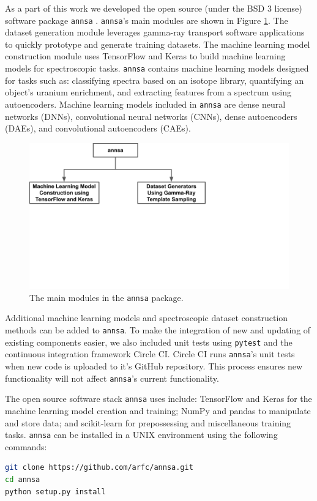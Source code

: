 As a part of this work we developed the open source (under the BSD 3 license) software package \verb|annsa| \cite{annsa}. \verb|annsa|'s main modules are shown in Figure \ref{fig:annsa_structure}. The dataset generation module leverages gamma-ray transport software applications to quickly prototype and generate training datasets. The machine learning model construction module uses TensorFlow \cite{tensorflow2015-whitepaper} and Keras \cite{chollet2015keras} to build machine learning models for spectroscopic tasks. \verb|annsa| contains machine learning models designed for tasks such as: classifying spectra based on an isotope library, quantifying an object's uranium enrichment, and extracting features from a spectrum using autoencoders. Machine learning models included in \verb|annsa| are dense neural networks (DNNs), convolutional neural networks (CNNs), dense autoencoders (DAEs), and convolutional autoencoders (CAEs).

\begin{figure}[H]
	\centering
	\includegraphics[trim=0 310 300 0,clip,width=0.8\linewidth]{images/annsa_structure}
	\caption{The main modules in the \texttt{annsa} package.}
	\label{fig:annsa_structure}
\end{figure}

Additional machine learning models and spectroscopic dataset construction methods can be added to \verb|annsa|. To make the integration of new and updating of existing components easier, we also included unit tests using \verb|pytest| \cite{pytest3.5} and the continuous integration framework Circle CI. Circle CI runs \verb|annsa|'s unit tests when new code is uploaded to it's GitHub repository. This process ensures new functionality will not affect \verb|annsa|'s current functionality.

The open source software stack \verb|annsa| uses include: TensorFlow \cite{tensorflow2015-whitepaper} and Keras \cite{chollet2015keras} for the machine learning model creation and training; NumPy \cite{numpy} and pandas \cite{mckinney-proc-scipy-2010} to manipulate and store data; and scikit-learn \cite{scikit-learn} for prepossessing and miscellaneous training tasks. \verb|annsa| can be installed in a UNIX environment using the following commands:
\begin{lstlisting}[language=bash, basicstyle={\small\ttfamily}]
git clone https://github.com/arfc/annsa.git
cd annsa
python setup.py install
\end{lstlisting}
